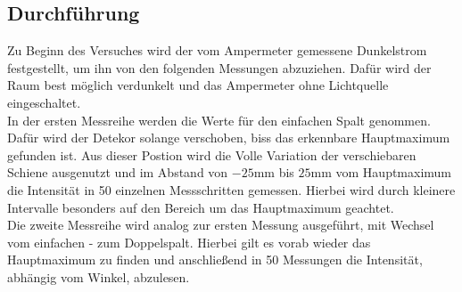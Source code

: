\subsection{Durchführung}
Zu Beginn des Versuches wird der vom Ampermeter gemessene Dunkelstrom festgestellt, um ihn von den folgenden Messungen abzuziehen.
Dafür wird der Raum best möglich verdunkelt und das Ampermeter ohne Lichtquelle eingeschaltet.
\\ 
\newline
In der ersten Messreihe werden die Werte für den einfachen Spalt genommen. Dafür wird der Detekor solange verschoben, biss das erkennbare Hauptmaximum 
gefunden ist. Aus dieser Postion wird die Volle Variation der verschiebaren Schiene ausgenutzt und im Abstand von $-25 \si{\mm}$ bis 
$25 \si{\mm}$ vom Hauptmaximum die Intensität in 50 einzelnen Messschritten gemessen. 
Hierbei wird durch kleinere Intervalle besonders auf den Bereich um das Hauptmaximum geachtet.
\\
\newline
Die zweite Messreihe wird analog zur ersten Messung ausgeführt, mit Wechsel vom einfachen - zum Doppelspalt.
Hierbei gilt es vorab wieder das Hauptmaximum zu finden und anschließend in 50 Messungen die Intensität, abhängig vom Winkel,
abzulesen. 